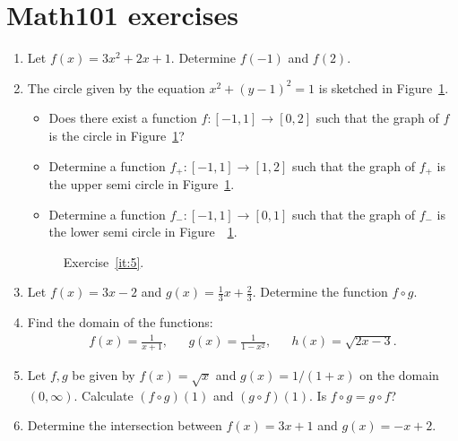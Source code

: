 \newpage
\section{Math101 exercises}
\begin{enumerate}
	
	\item Let $f(x)=3x^2+2x+1$. Determine $f(-1)$ and $f(2)$.
	
	\item \label{it:5} The circle given by the equation $x^{2} +(y-1)^{2}=1$ is sketched in Figure~\ref{fig:5}.
	\begin{itemize}
		\item Does there exist a function $f\colon [-1,1]\to [0,2]$ such that the graph of $f$ is the circle in Figure~\ref{fig:5}?
		\item Determine a function $f_+\colon [-1,1]\to [1,2]$ such that the graph of $f_+$ is the upper semi circle in Figure~\ref{fig:5}.
		\item Determine a function $f_-\colon [-1,1]\to [0,1]$ such that the graph of $f_-$ is the lower semi circle in Figure~~\ref{fig:5}.
	\end{itemize}	
	\begin{figure}
		\centering
		\caption{Exercise~\ref{it:5}.}
		\label{fig:5}
	\end{figure}

	
	\item Let $f(x)=3x-2$ and $g(x)=\frac{1}{3}x+\frac{2}{3}$. Determine the function $f\circ g$.
	
	
		\item Find the domain of the functions:
	\begin{align*}
	f(x)=\frac{1}{x+1},&& g(x)=\frac{1}{1-x^2},&& h(x)=\sqrt{2x-3}.
	\end{align*}
	
	
	\item  Let $f,g$ be given by $f(x)=\sqrt{x}$ and $g(x)=1/(1+x)$ on the domain $(0,\infty)$. Calculate $(f\circ g)(1)$ and $(g\circ f)(1)$. Is $f\circ g=g\circ f$?
	
	\item Determine the intersection between $f(x)=3x+1$ and $g(x)=-x+2$.	
	

\end{enumerate}
